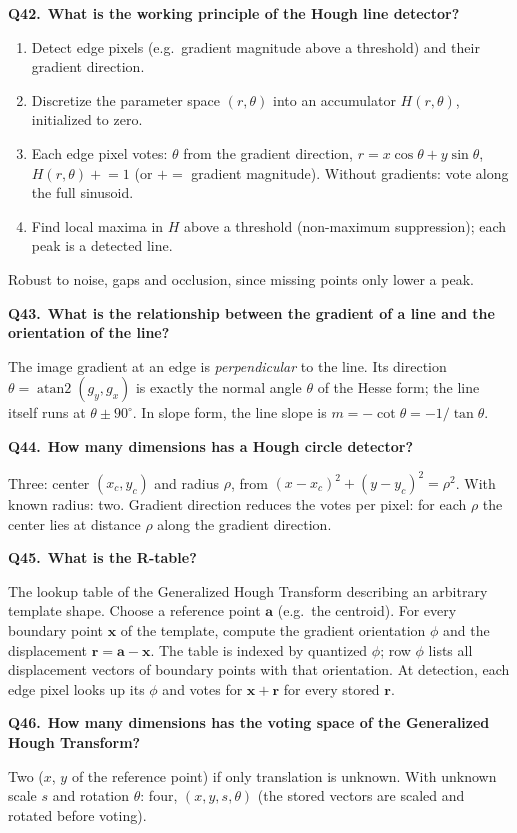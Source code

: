 \documentclass[11pt,a4paper]{article}
\newcommand{\keep}[1]{\par
  \ifdim\dimexpr\pagegoal-\pagetotal\relax<#1\relax\newpage\fi}
\newcommand{\q}[2]{\keep{2.5cm}\medskip
  {\sffamily\bfseries\color{questc}Q#1.}\ {\sffamily\bfseries #2}\par}
\begin{document}
\q{42}{What is the working principle of the Hough line detector?}
\begin{enumerate}
  \item Detect edge pixels (e.g.\ gradient magnitude above a threshold) and
    their gradient direction.
  \item Discretize the parameter space $(r,\theta)$ into an accumulator
    $H(r,\theta)$, initialized to zero.
  \item Each edge pixel votes: $\theta$ from the gradient direction,
    $r = x\cos\theta + y\sin\theta$, $H(r,\theta) \mathrel{+}= 1$ (or
    $+=$ gradient magnitude). Without gradients: vote along the full sinusoid.
  \item Find local maxima in $H$ above a threshold
    (non-maximum suppression); each peak is a detected line.
\end{enumerate}
\noindent
Robust to noise, gaps and occlusion, since missing points only lower a peak.

\q{43}{What is the relationship between the gradient of a line and the
orientation of the line?}
The image gradient at an edge is \emph{perpendicular} to the line. Its
direction $\theta = \operatorname{atan2}(g_y, g_x)$ is exactly the normal angle
$\theta$ of the Hesse form; the line itself runs at $\theta \pm 90^\circ$.
In slope form, the line slope is $m = -\cot\theta = -1/\tan\theta$.

\q{44}{How many dimensions has a Hough circle detector?}
Three: center $(x_c, y_c)$ and radius $\rho$, from
$(x-x_c)^2 + (y-y_c)^2 = \rho^2$. With known radius: two. Gradient direction
reduces the votes per pixel: for each $\rho$ the center lies at distance $\rho$
along the gradient direction.

\q{45}{What is the R-table?}
The lookup table of the Generalized Hough Transform describing an arbitrary
template shape. Choose a reference point $\mathbf{a}$ (e.g.\ the centroid). For
every boundary point $\mathbf{x}$ of the template, compute the gradient
orientation $\phi$ and the displacement $\mathbf{r} = \mathbf{a}-\mathbf{x}$.
The table is indexed by quantized $\phi$; row $\phi$ lists all displacement
vectors of boundary points with that orientation. At detection, each edge pixel
looks up its $\phi$ and votes for $\mathbf{x}+\mathbf{r}$ for every stored
$\mathbf{r}$.

\q{46}{How many dimensions has the voting space of the Generalized Hough
Transform?}
Two ($x$, $y$ of the reference point) if only translation is unknown. With
unknown scale $s$ and rotation $\theta$: four, $(x,y,s,\theta)$ (the stored
vectors are scaled and rotated before voting).
\end{document}
